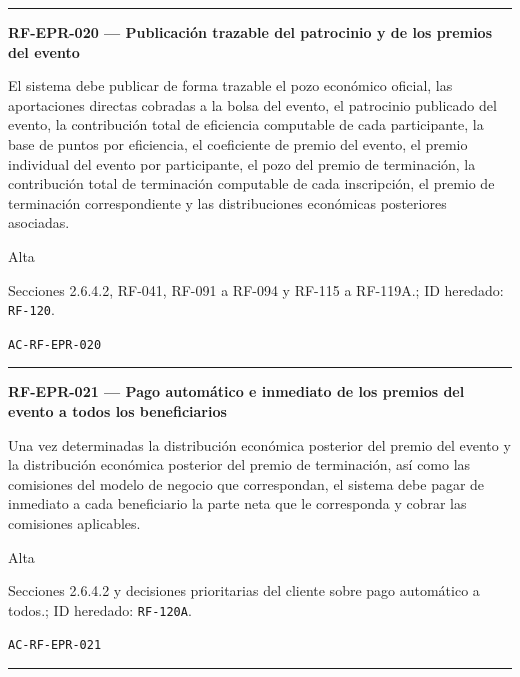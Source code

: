 \documentclass[10pt,letterpaper]{article}
\begin{document}
\vspace{0.25em}\hrule\vspace{0.65em}
\noindent\textbf{RF-EPR-020 --- Publicación trazable del patrocinio y de los premios del evento}\par
\begin{description}[style=nextline,leftmargin=3.15cm,labelwidth=2.8cm,font=\normalfont\bfseries]
\item[Obligación] El sistema debe publicar de forma trazable el pozo económico oficial, las aportaciones directas cobradas a la bolsa del evento, el patrocinio publicado del evento, la contribución total de eficiencia computable de cada participante, la base de puntos por eficiencia, el coeficiente de premio del evento, el premio individual del evento por participante, el pozo del premio de terminación, la contribución total de terminación computable de cada inscripción, el premio de terminación correspondiente y las distribuciones económicas posteriores asociadas.
\item[Prioridad] Alta
\item[Procedencia] Secciones 2.6.4.2, RF-041, RF-091 a RF-094 y RF-115 a RF-119A.; ID heredado: \texttt{RF-120}.
\item[Verificación] \texttt{AC-RF-EPR-020}
\end{description}
\vspace{0.25em}\hrule\vspace{0.65em}
\noindent\textbf{RF-EPR-021 --- Pago automático e inmediato de los premios del evento a todos los beneficiarios}\par
\begin{description}[style=nextline,leftmargin=3.15cm,labelwidth=2.8cm,font=\normalfont\bfseries]
\item[Obligación] Una vez determinadas la distribución económica posterior del premio del evento y la distribución económica posterior del premio de terminación, así como las comisiones del modelo de negocio que correspondan, el sistema debe pagar de inmediato a cada beneficiario la parte neta que le corresponda y cobrar las comisiones aplicables.
\item[Prioridad] Alta
\item[Procedencia] Secciones 2.6.4.2 y decisiones prioritarias del cliente sobre pago automático a todos.; ID heredado: \texttt{RF-120A}.
\item[Verificación] \texttt{AC-RF-EPR-021}
\end{description}
\vspace{0.25em}\hrule\vspace{0.65em}
\end{document}
